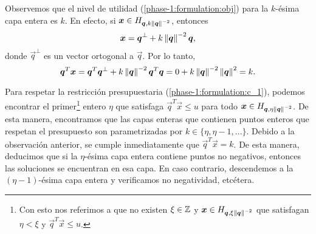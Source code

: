 Observemos que el nivel de utilidad (\ref{phase-1:formulation:obj}) para la $k$-ésima capa entera
es $k$. En efecto, si $\boldsymbol{x} \in H_{\boldsymbol{q}, k\left\lVert \boldsymbol{q} \right\rVert^{-2}}$, entonces
\begin{equation*}
	\boldsymbol{x} = \boldsymbol{q}^{\perp} + k\left\lVert \boldsymbol{q} \right\rVert^{-2}\boldsymbol{q},
\end{equation*}
donde $\vec{q}^{\perp}$ es un vector ortogonal a $\vec{q}$. Por lo tanto,
\begin{equation*}
	\boldsymbol{q}^T\boldsymbol{x} = \boldsymbol{q}^T\boldsymbol{q}^{\perp} + k\left\lVert \boldsymbol{q} \right\rVert^{-2}\boldsymbol{q}^T\boldsymbol{q}
	= 0 + k \left\lVert \boldsymbol{q} \right\rVert^{-2} \left\lVert \boldsymbol{q} \right\rVert^{2} = k.
\end{equation*}

Para respetar la restricción presupuestaria (\ref{phase-1:formulation:c_1}), podemos encontrar el
primer\footnote{
	Con esto nos referimos a que no existen $\xi \in \mathbb{Z}$ y $\boldsymbol{x} \in H_{\boldsymbol{q},
	\xi\left\lVert \boldsymbol{q} \right\rVert^{-2}}$ que satisfagan $\eta < \xi$ y $\vec{q}^T\vec{x} \leq u$.
} entero $\eta$ que satisfaga $\vec{q}^T\vec{x} \leq u$ para todo $\boldsymbol{x} \in H_{\boldsymbol{q},
\eta\left\lVert \boldsymbol{q} \right\rVert^{-2}}$. De esta manera, encontramos que las capas enteras que contienen puntos
enteros que respetan el presupuesto son parametrizadas por $k \in \lbrace \eta, \eta - 1, \ldots
\rbrace$. Debido a la observación anterior, se cumple inmediatamente que $\vec{q}^T\vec{x} = k$. De
esta manera, deducimos que si la $\eta$-ésima capa entera contiene puntos no negativos, entonces las
soluciones se encuentran en esa capa. En caso contrario, descendemos a la $(\eta - 1)$-ésima capa
entera y verificamos no negatividad, etcétera.


